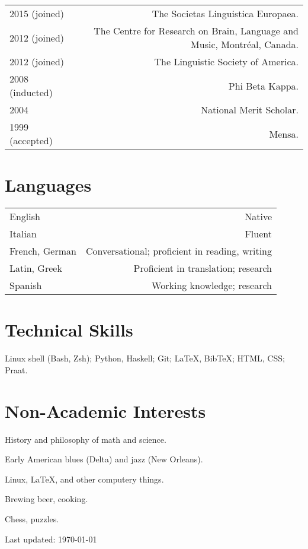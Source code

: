 \documentclass[11pt,letterpaper,twoside]{article}
\makeatletter
\newenvironment{cvsection}{%
  \renewcommand{\arraystretch}{1.75}
  \begin{longtable}[l]{@{} L R @{}}
}{%
  \end{longtable}
}
\makeatother
\begin{document}
\begin{cvsection}
  2015 {\footnotesize (joined)} & The Societas Linguistica Europaea.\\

  2012 {\footnotesize (joined)} & The Centre for Research on Brain, Language
  and Music, Montr\'{e}al, Canada.\\

  2012 {\footnotesize (joined)} & The Linguistic Society of America.\\

  2008 {\footnotesize (inducted)} & Phi Beta Kappa.\\

  2004 & National Merit Scholar.\\

  1999 {\footnotesize (accepted)} & Mensa.\\
\end{cvsection}

\section*{Languages}

\begin{cvsection}
  English & Native\\
  Italian & Fluent\\
  French, German & Conversational; proficient in reading, writing\\
  Latin, Greek & Proficient in translation; research\\
  Spanish & Working knowledge; research\\
\end{cvsection}

\section*{Technical Skills}

Linux shell (Bash, Zsh); Python, Haskell; Git; \LaTeX, Bib\TeX; HTML, CSS;
Praat.

\section*{Non-Academic Interests}

\begin{list}{}{\leftmargin=0pt}
  \item History and philosophy of math and science.
  \item Early American blues (Delta) and jazz (New Orleans).
  \item Linux, \LaTeX{}, and other computery things.
  \item Brewing beer, cooking.
  \item Chess, puzzles.
\end{list}

\null\hfill {\footnotesize Last updated: \today}
\end{document}

